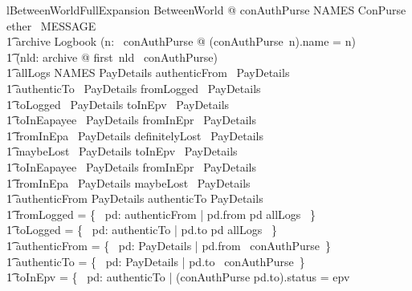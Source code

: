 \begin{LNewLemma}
\begin{zeves-theorem}{lBetweenWorldFullExpansion}
    \forall BetweenWorld @ conAuthPurse \in NAMES \finj ConPurse \land
            ether \in \power~MESSAGE \land \\ \t1
            archive \in Logbook \land  (\forall n: \dom~conAuthPurse @ (conAuthPurse~n).name = n) \land \\ \t1
            (\forall nld: archive @ first~nld \in \dom~conAuthPurse) \land \\
         \t1
            allLogs \in NAMES \rel PayDetails \land
            authenticFrom \in \power~PayDetails \land \\ \t1
            authenticTo \in \power~PayDetails \land
            fromLogged \in \power~PayDetails \land \\ \t1
            toLogged \in \power~PayDetails \land
            toInEpv \in \power~PayDetails \land \\ \t1
            toInEapayee \in \power~PayDetails \land
            fromInEpr \in \power~PayDetails \land \\ \t1
            fromInEpa \in \power~PayDetails \land
            definitelyLost \in \power~PayDetails \land \\ \t1
            maybeLost \in \power~PayDetails \land
            toInEpv \in \finset~PayDetails \land \\ \t1
            toInEapayee \in \finset~PayDetails \land
            fromInEpr \in \finset~PayDetails \land \\ \t1
            fromInEpa \in \finset~PayDetails \land
            maybeLost \in \finset~PayDetails \land \\ \t1
            authenticFrom \in \finset PayDetails \land
            authenticTo \in \finset PayDetails \land \\ \t1
            fromLogged = \{~ pd: authenticFrom | pd.from \mapsto pd \in allLogs ~\} \land \\ \t1
            toLogged = \{~ pd: authenticTo | pd.to \mapsto pd \in allLogs ~\} \land \\ \t1
            authenticFrom = \{~ pd: PayDetails | pd.from \in \dom~conAuthPurse~\} \land \\ \t1
            authenticTo = \{~ pd: PayDetails | pd.to \in \dom~conAuthPurse~\} \land \\ \t1
            toInEpv = \{~ pd: authenticTo | (conAuthPurse pd.to).status = epv \\

\end{zeves-theorem}
\end{LNewLemma}
